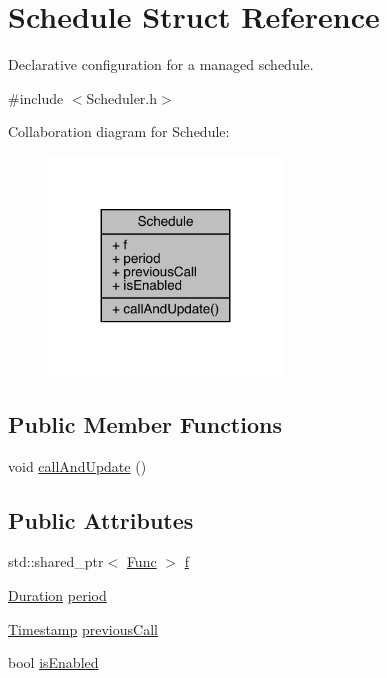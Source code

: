 \hypertarget{struct_schedule}{}\section{Schedule Struct Reference}
\label{struct_schedule}


Declarative configuration for a managed schedule.  




{\ttfamily \#include $<$Scheduler.\+h$>$}



Collaboration diagram for Schedule\+:\nopagebreak
\begin{figure}[H]
\begin{center}
\leavevmode
\includegraphics[width=176pt]{struct_schedule__coll__graph}
\end{center}
\end{figure}
\subsection*{Public Member Functions}
\begin{DoxyCompactItemize}
\item 
void \mbox{\hyperlink{struct_schedule_a13d8ce84c7b38bf5366e5512e2a55e23}{call\+And\+Update}} ()
\end{DoxyCompactItemize}
\subsection*{Public Attributes}
\begin{DoxyCompactItemize}
\item 
std\+::shared\+\_\+ptr$<$ \mbox{\hyperlink{_scheduler_8h_a2125a5a2949d6ee13163b671159c0d4d}{Func}} $>$ \mbox{\hyperlink{struct_schedule_a9d9c9f5ecb6213eea85e061b900ac398}{f}}
\item 
\mbox{\hyperlink{_scheduler_8h_aca1fa1a7edde6bf9e22c7617400fad31}{Duration}} \mbox{\hyperlink{struct_schedule_a63741d77dabb232150e334168a4c72c2}{period}}
\item 
\mbox{\hyperlink{_scheduler_8h_a67c6ac2398ae81344762ebb1b71fc9a7}{Timestamp}} \mbox{\hyperlink{struct_schedule_ab512e16f533bdc7a1c9d8c5c2bad0f7a}{previous\+Call}}
\item 
bool \mbox{\hyperlink{struct_schedule_a799716253aaa56ab67ceacee1a727a28}{is\+Enabled}}
\end{DoxyCompactItemize}


